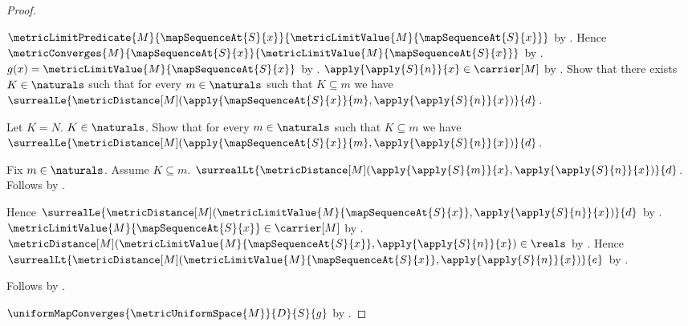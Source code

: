 \begin{proof}
\begin{subproof}
\begin{subproof}
            $\metricLimitPredicate{M}{\mapSequenceAt{S}{x}}
                {\metricLimitValue{M}{\mapSequenceAt{S}{x}}}$
                by .
            Hence $\metricConverges{M}{\mapSequenceAt{S}{x}}
                {\metricLimitValue{M}{\mapSequenceAt{S}{x}}}$
                by .
            $g(x)=\metricLimitValue{M}{\mapSequenceAt{S}{x}}$
                by .
            $\apply{\apply{S}{n}}{x}\in\carrier[M]$
                by .
            Show that there exists $K\in\naturals$ such that for every
                $m\in\naturals$ such that $K\subseteq m$ we have
                $\surrealLe{\metricDistance[M]
                    (\apply{\mapSequenceAt{S}{x}}{m},
                     \apply{\apply{S}{n}}{x})}{d}$.
            \begin{subproof}
                Let $K=N$.
                $K\in\naturals$.
                Show that for every $m\in\naturals$ such that
                    $K\subseteq m$ we have
                    $\surrealLe{\metricDistance[M]
                        (\apply{\mapSequenceAt{S}{x}}{m},
                         \apply{\apply{S}{n}}{x})}{d}$.
                \begin{subproof}
                    Fix $m\in\naturals$.
                    Assume $K\subseteq m$.
                    $\surrealLt{\metricDistance[M]
                        (\apply{\apply{S}{m}}{x},
                         \apply{\apply{S}{n}}{x})}{d}$.
                    Follows by
                        .
                \end{subproof}
            \end{subproof}
            Hence
                $\surrealLe{\metricDistance[M]
                    (\metricLimitValue{M}{\mapSequenceAt{S}{x}},
                     \apply{\apply{S}{n}}{x})}{d}$
                by .
            $\metricLimitValue{M}{\mapSequenceAt{S}{x}}\in\carrier[M]$
                by .
            $\metricDistance[M]
                (\metricLimitValue{M}{\mapSequenceAt{S}{x}},
                 \apply{\apply{S}{n}}{x})\in\reals$
                by .
            Hence
                $\surrealLt{\metricDistance[M]
                    (\metricLimitValue{M}{\mapSequenceAt{S}{x}},
                     \apply{\apply{S}{n}}{x})}{e}$
                by
                .
        \end{subproof}
        Follows by \auto.
    \end{subproof}
    $\uniformMapConverges{\metricUniformSpace{M}}{D}{S}{g}$
        by .
\end{proof}

